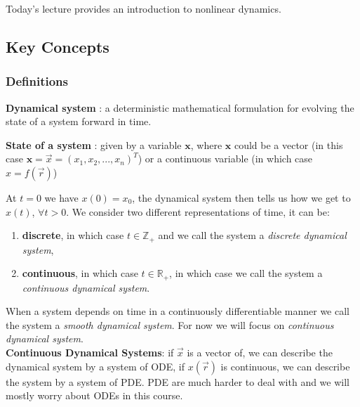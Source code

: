Today's lecture provides an introduction to nonlinear dynamics. 

\subsection{Key Concepts}
\subsubsection{Definitions}

\begin{definition}
    \textbf{Dynamical system} : a deterministic mathematical formulation for evolving the state of a system forward in time.
\end{definition}

\begin{definition}
    \textbf{State of a system} : given by a variable $\bm{x}$, where $\bm{x}$ could be a vector (in this case $\bm{x} = \vec{x} = (x_1,x_2,...,x_n)^T$) or a continuous variable (in which case $x = f(\vec{r})$)
\end{definition}

At $t=0$ we have $x(0) = x_0$, the dynamical system then tells us how we get to $x(t)$, $\forall t > 0$. We consider two different representations of time, it can be: 
\begin{enumerate}
    \item \textbf{discrete}, in which case $t \in \mathbb{Z}_+$ and we call the system a \textit{discrete dynamical system},
    \item \textbf{continuous}, in which case $t \in \mathbb{R}_+$, in which case we call the system a \textit{continuous dynamical system}.
\end{enumerate}

When a system depends on time in a continuously differentiable manner we call the system a \textit{smooth dynamical system}. For now we will focus on \textit{continuous dynamical system}.\\

\noindent
\textbf{Continuous Dynamical Systems}: if $\vec{x}$ is a vector of, we can describe the dynamical system by a system of ODE, if $x(\vec{r})$ is continuous, we can describe the system by a system of PDE. PDE are much harder to deal with and we will mostly worry about ODEs in this course.  \\

